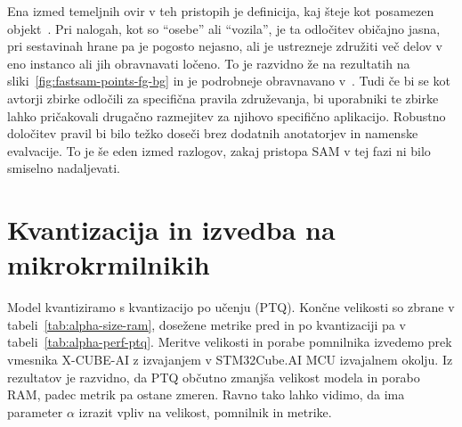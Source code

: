 \documentclass[a4paper,twoside,openright,12pt,slovene]{book}
\begin{document}
        Ena izmed temeljnih ovir v teh pristopih je definicija, kaj šteje kot
        posamezen objekt~\cite{src:koporec2020cognitive}. Pri nalogah, kot so \enquote{osebe} ali \enquote{vozila}, je ta
        odločitev običajno jasna, pri sestavinah hrane pa je pogosto nejasno,
        ali je ustrezneje združiti več delov v eno instanco ali jih obravnavati
        ločeno. To je razvidno že na rezultatih na
        sliki~\ref{fig:fastsam-points-fg-bg}
        in
        je podrobneje obravnavano v~\cite{src:koporec2020cognitive}. Tudi če bi
        se kot avtorji zbirke odločili za specifična pravila združevanja, bi
        uporabniki te zbirke lahko pričakovali drugačno razmejitev za njihovo
        specifično aplikacijo. Robustno določitev pravil bi bilo težko doseči
        brez dodatnih anotatorjev in namenske evalvacije. To je še eden
        izmed razlogov, zakaj pristopa SAM v tej fazi ni bilo smiselno
        nadaljevati.
    
    \section{Kvantizacija in izvedba na mikrokrmilnikih}

        Model kvantiziramo s kvantizacijo po učenju (PTQ). Končne velikosti so
        zbrane v
        tabeli~\ref{tab:alpha-size-ram},
        dosežene metrike pred in po kvantizaciji pa v
        tabeli~\ref{tab:alpha-perf-ptq}.
        Meritve velikosti in porabe pomnilnika izvedemo prek vmesnika X-CUBE-AI
        z izvajanjem v STM32Cube.AI MCU izvajalnem okolju. Iz rezultatov je
        razvidno, da PTQ občutno zmanjša velikost modela in porabo RAM, padec
        metrik pa ostane zmeren. Ravno tako lahko vidimo, da ima parameter
        \(\alpha\) izrazit vpliv na velikost, pomnilnik in metrike.
\end{document}
